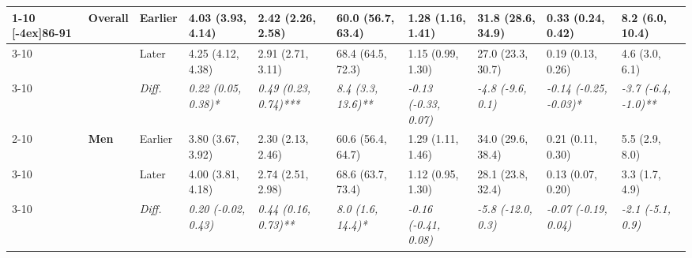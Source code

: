 \documentclass[12pt, a4paper]{article}
\begin{document}
\begin{appendices}
\begin{table}[!p]
{\begin{tabular}[t]{>{}l>{}lllllllll}
        \cmidrule{1-10}
        \multirow{9}{*}[-4ex]{\textbf{86-91}} & \multirow{3}{*}{\textbf{Overall}} & Earlier                       & 4.03 (3.93, 4.14)                           & 2.42 (2.26, 2.58)                            & 60.0 (56.7, 63.4)                           & 1.28 (1.16, 1.41)                           & 31.8 (28.6, 34.9)                          & 0.33 (0.24, 0.42)                               & 8.2 (6.0, 10.4)                               \\
        \cmidrule{3-10}
                                              &                                   & Later                         & 4.25 (4.12, 4.38)                           & 2.91 (2.71, 3.11)                            & 68.4 (64.5, 72.3)                           & 1.15 (0.99, 1.30)                           & 27.0 (23.3, 30.7)                          & 0.19 (0.13, 0.26)                               & 4.6 (3.0, 6.1)                                \\
        \cmidrule{3-10}
                                              &                                   & \cellcolor{gray!10}\em{Diff.} & \cellcolor{gray!10}\em{0.22 (0.05, 0.38)*}  & \cellcolor{gray!10}\em{0.49 (0.23, 0.74)***} & \cellcolor{gray!10}\em{8.4 (3.3, 13.6)**}   & \cellcolor{gray!10}\em{-0.13 (-0.33, 0.07)} & \cellcolor{gray!10}\em{-4.8 (-9.6, 0.1)}   & \cellcolor{gray!10}\em{-0.14 (-0.25, -0.03)*}   & \cellcolor{gray!10}\em{-3.7 (-6.4, -1.0)**}   \\
        \cmidrule{2-10}
                                              & \multirow{3}{*}{\textbf{Men}}     & Earlier                       & 3.80 (3.67, 3.92)                           & 2.30 (2.13, 2.46)                            & 60.6 (56.4, 64.7)                           & 1.29 (1.11, 1.46)                           & 34.0 (29.6, 38.4)                          & 0.21 (0.11, 0.30)                               & 5.5 (2.9, 8.0)                                \\
        \cmidrule{3-10}
                                              &                                   & Later                         & 4.00 (3.81, 4.18)                           & 2.74 (2.51, 2.98)                            & 68.6 (63.7, 73.4)                           & 1.12 (0.95, 1.30)                           & 28.1 (23.8, 32.4)                          & 0.13 (0.07, 0.20)                               & 3.3 (1.7, 4.9)                                \\
        \cmidrule{3-10}
                                              &                                   & \cellcolor{gray!10}\em{Diff.} & \cellcolor{gray!10}\em{0.20 (-0.02, 0.43)}  & \cellcolor{gray!10}\em{0.44 (0.16, 0.73)**}  & \cellcolor{gray!10}\em{8.0 (1.6, 14.4)*}    & \cellcolor{gray!10}\em{-0.16 (-0.41, 0.08)} & \cellcolor{gray!10}\em{-5.8 (-12.0, 0.3)}  & \cellcolor{gray!10}\em{-0.07 (-0.19, 0.04)}     & \cellcolor{gray!10}\em{-2.1 (-5.1, 0.9)}      \\

\end{tabular}}
\end{table}
\end{appendices}
\end{document}
